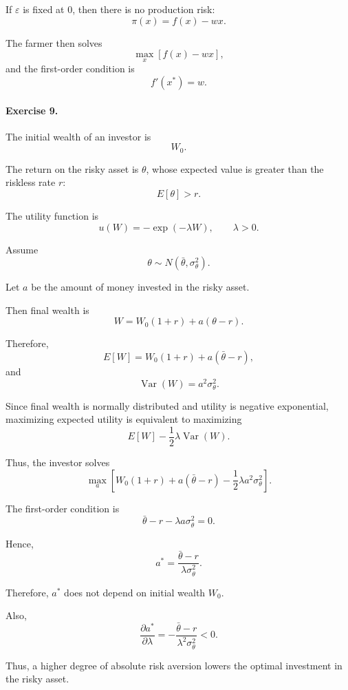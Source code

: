 If \(\varepsilon\) is fixed at \(0\), then there is no production risk:
\[
\pi(x)=f(x)-wx.
\]

The farmer then solves
\[
\max_x [f(x)-wx],
\]
and the first-order condition is
\[
f'(x^*)=w.
\]

\paragraph{Exercise 9.}

The initial wealth of an investor is
\[
W_0.
\]

The return on the risky asset is \(\theta\), whose expected value is greater than the riskless rate \(r\):
\[
E[\theta]>r.
\]

The utility function is
\[
u(W)
=
-\exp(-\lambda W),
\qquad
\lambda>0.
\]

Assume
\[
\theta\sim N(\bar\theta,\sigma_\theta^2).
\]

Let \(a\) be the amount of money invested in the risky asset.

Then final wealth is
\[
W
=
W_0(1+r)+a(\theta-r).
\]

Therefore,
\[
E[W]
=
W_0(1+r)+a(\bar\theta-r),
\]
and
\[
\operatorname{Var}(W)
=
a^2\sigma_\theta^2.
\]

Since final wealth is normally distributed and utility is negative exponential, maximizing expected utility is equivalent to maximizing
\[
E[W]
-
\frac{1}{2}\lambda\operatorname{Var}(W).
\]

Thus, the investor solves
\[
\max_a
\left[
W_0(1+r)+a(\bar\theta-r)
-
\frac{1}{2}\lambda a^2\sigma_\theta^2
\right].
\]

The first-order condition is
\[
\bar\theta-r-\lambda a\sigma_\theta^2=0.
\]

Hence,
\[
a^*
=
\frac{\bar\theta-r}{\lambda\sigma_\theta^2}.
\]

Therefore, \(a^*\) does not depend on initial wealth \(W_0\).

Also,
\[
\frac{\partial a^*}{\partial \lambda}
=
-
\frac{\bar\theta-r}{\lambda^2\sigma_\theta^2}<0.
\]

Thus, a higher degree of absolute risk aversion lowers the optimal investment in the risky asset.






